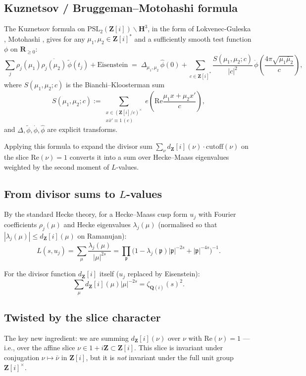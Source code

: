 \documentclass[11pt]{article}
\theoremstyle{definition}
\newcommand{\Z}{\mathbf{Z}}
\newcommand{\Q}{\mathbf{Q}}
\newcommand{\R}{\mathbf{R}}
\newcommand{\HH}{\mathbf{H}}
\newcommand{\Zi}{\Z[i]}
\newcommand{\Re}{\mathrm{Re}}
\renewcommand{\Re}{\mathrm{Re}}
\begin{document}
\subsection{Kuznetsov / Bruggeman--Motohashi formula}

The Kuznetsov formula on $\mathrm{PSL}_2(\Zi)\backslash\HH^3$, in the form of Lokvenec-Guleska \cite{LG}, Motohashi \cite{motohashi-bianchi}, gives for any $\mu_1,\mu_2\in\Zi^*$ and a sufficiently smooth test function $\phi$ on $\R_{\ge 0}$:
\[
\sum_j\rho_j(\mu_1)\overline{\rho_j(\mu_2)}\,\widetilde\phi(t_j)+\text{Eisenstein}\;=\;\Delta_{\mu_1,\mu_2}\,\widehat\phi(0)+\sum_{c\in\Zi^*}\frac{S(\mu_1,\mu_2;c)}{|c|^2}\,\dot\phi\!\left(\frac{4\pi\sqrt{\mu_1\bar\mu_2}}{c}\right),
\]
where $S(\mu_1,\mu_2;c)$ is the Bianchi--Kloosterman sum
\[
S(\mu_1,\mu_2;c):=\sum_{\substack{x\in(\Zi/c)^\times\\ x\bar x'\equiv 1\,(c)}}e\!\left(\Re\!\frac{\mu_1 x+\mu_2 x'}{c}\right),
\]
and $\Delta,\widetilde\phi,\dot\phi,\widehat\phi$ are explicit transforms.

Applying this formula to expand the divisor sum $\sum_\nu d_\Zi(\nu)\cdot\text{cutoff}(\nu)$ on the slice $\Re(\nu)=1$ converts it into a sum over Hecke--Maass eigenvalues weighted by the second moment of $L$-values.

\subsection{From divisor sums to $L$-values}

By the standard Hecke theory, for a Hecke--Maass cusp form $u_j$ with Fourier coefficients $\rho_j(\mu)$ and Hecke eigenvalues $\lambda_j(\mu)$ (normalised so that $|\lambda_j(\mu)|\le d_\Zi(\mu)$ on Ramanujan):
\[
L(s,u_j)=\sum_\mu\frac{\lambda_j(\mu)}{|\mu|^{2s}}=\prod_{\mathfrak p}\bigl(1-\lambda_j(\mathfrak p)|\mathfrak p|^{-2s}+|\mathfrak p|^{-4s}\bigr)^{-1}.
\]

For the divisor function $d_\Zi$ itself ($u_j$ replaced by Eisenstein):
\[
\sum_\mu d_\Zi(\mu)|\mu|^{-2s}=\zeta_{\Q(i)}(s)^2.
\]

\subsection{Twisted by the slice character}

The key new ingredient: we are summing $d_\Zi(\nu)$ over $\nu$ with $\Re(\nu)=1$ — i.e., over the affine slice $\nu\in 1+i\Z\subset\Zi$. This slice is invariant under conjugation $\nu\mapsto\bar\nu$ in $\Zi$, but it is \emph{not} invariant under the full unit group $\Zi^\times$.
\end{document}
